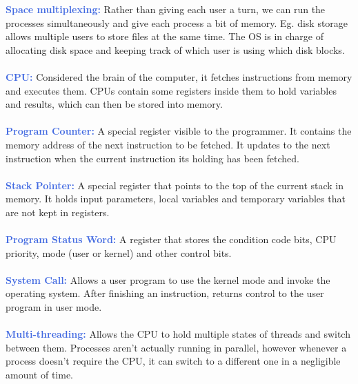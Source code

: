 \documentclass[a4paper,10pt]{article}
\begin{document}
\textcolor{RoyalBlue}{\textbf{Space multiplexing:}} Rather than giving each user a turn, we can run the processes simultaneously and give each process a bit of memory. Eg. disk storage allows multiple users to store files at the same time. The OS is in charge of allocating disk space and keeping track of which user is using which disk blocks. \\\\ 
\textcolor{RoyalBlue}{\textbf{CPU:}} Considered the brain of the computer, it fetches instructions from memory and executes them. CPUs contain some registers inside them to hold variables and results, which can then be stored into memory. \\\\
\textcolor{RoyalBlue}{\textbf{Program Counter:}} A special register visible to the programmer. It contains the memory address of the next instruction to be fetched. It updates to the next instruction when the current instruction its holding has been fetched. \\\\
\textcolor{RoyalBlue}{\textbf{Stack Pointer:}} A special register that points to the top of the current stack in memory. It holds input parameters, local variables and temporary variables that are not kept in registers. \\\\
\textcolor{RoyalBlue}{\textbf{Program Status Word:}} A register that stores the condition code bits, CPU priority, mode (user or kernel) and other control bits. \\\\
\newpage
\noindent \textcolor{RoyalBlue}{\textbf{System Call:}} Allows a user program to use the kernel mode and invoke the operating system. After finishing an instruction, returns control to the user program in user mode. \\\\
\textcolor{RoyalBlue}{\textbf{Multi-threading:}} Allows the CPU to hold multiple states of threads and switch between them. Processes aren't actually running in parallel, however whenever a process doesn't require the CPU, it can switch to a different one in a negligible amount of time. 
\end{document}
